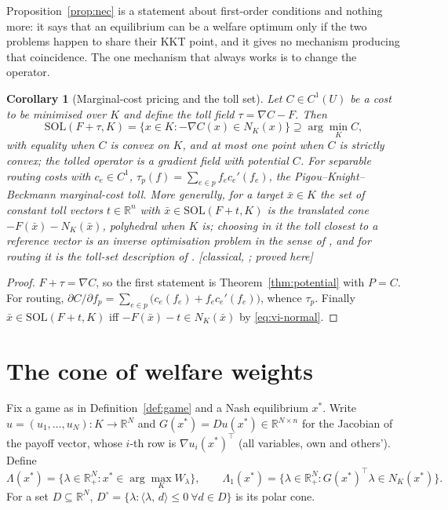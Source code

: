 \documentclass[11pt,a4paper]{article}
\theoremstyle{plain}
\newtheorem{corollary}[theorem]{Corollary}
\theoremstyle{definition}
\theoremstyle{remark}
\newcommand{\R}{\mathbb{R}}
\newcommand{\SOL}{\mathrm{SOL}}
\newcommand{\NC}{N}
\newcommand{\ip}[2]{\langle #1,\,#2\rangle}
\newcommand{\status}[1]{\textsf{\small [#1]}}
\newcommand{\Lam}{\Lambda}
\newcommand{\Lone}{\Lambda_{1}}
\begin{document}
Proposition~\ref{prop:nec} is a statement about first-order conditions and nothing more: it says that an equilibrium can be a welfare optimum only if the two problems happen to share their KKT point, and it gives no mechanism producing that coincidence. The one mechanism that always works is to change the operator.

\begin{corollary}[Marginal-cost pricing and the toll set]\label{cor:toll}
Let $C\in C^1(U)$ be a cost to be minimised over $K$ and define the \emph{toll field} $\tau=\nabla C-F$. Then
\[
\SOL(F+\tau,K)=\{x\in K:-\nabla C(x)\in\NC_K(x)\}\supseteq\arg\min_KC,
\]
with equality when $C$ is convex on $K$, and at most one point when $C$ is strictly convex; the tolled operator is a gradient field with potential $C$. For separable routing costs with $c_e\in C^1$, $\tau_p(f)=\sum_{e\in p}f_ec_e'(f_e)$, the Pigou--Knight--Beckmann marginal-cost toll. More generally, for a target $\bar x\in K$ the set of constant toll vectors $t\in\R^n$ with $\bar x\in\SOL(F+t,K)$ is the translated cone $-F(\bar x)-\NC_K(\bar x)$, polyhedral when $K$ is; choosing in it the toll closest to a reference vector is an inverse optimisation problem in the sense of \citet{ahujaOrlin2001}, and for routing it is the toll-set description of \citet{hearnRamana1998}. \status{classical, \citealp{pigou1920,knight1924,beckmann1956,hearnRamana1998}; proved here}
\end{corollary}
\begin{proof}
$F+\tau=\nabla C$, so the first statement is Theorem~\ref{thm:potential} with $P=C$. For routing, $\partial C/\partial f_p=\sum_{e\in p}\big(c_e(f_e)+f_ec_e'(f_e)\big)$, whence $\tau_p$. Finally $\bar x\in\SOL(F+t,K)$ iff $-F(\bar x)-t\in\NC_K(\bar x)$ by \eqref{eq:vi-normal}.
\end{proof}

\section{The cone of welfare weights}\label{sec:cone}

Fix a game as in Definition~\ref{def:game} and a Nash equilibrium $x^*$. Write $u=(u_1,\dots,u_N)\colon K\to\R^N$ and $G(x^*)=Du(x^*)\in\R^{N\times n}$ for the Jacobian of the payoff vector, whose $i$-th row is $\nabla u_i(x^*)^{\!\top}$ (all variables, own and others'). Define
\[
\Lam(x^*)=\{\lambda\in\R^N_+: x^*\in\arg\max_KW_\lambda\},\qquad
\Lone(x^*)=\{\lambda\in\R^N_+: G(x^*)^{\!\top}\lambda\in\NC_K(x^*)\}.
\]
For a set $D\subseteq\R^N$, $D^\circ=\{\lambda:\ip{\lambda}{d}\le 0\ \forall d\in D\}$ is its polar cone.
\end{document}
